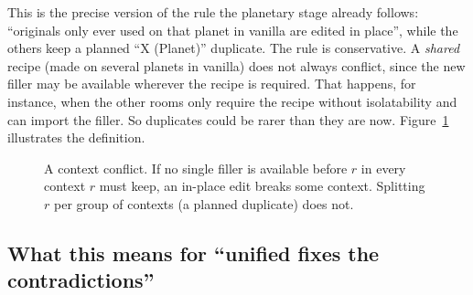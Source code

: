 This is the precise version of the rule the planetary stage already follows: ``originals only ever used on that planet in vanilla are edited in place'', while the others keep a planned ``X (Planet)'' duplicate. The rule is conservative. A \emph{shared} recipe (made on several planets in vanilla) does not always conflict, since the new filler may be available wherever the recipe is required. That happens, for instance, when the other rooms only require the recipe without isolatability and can import the filler. So duplicates could be rarer than they are now. Figure~\ref{fig:conflict} illustrates the definition. \ResultsConflict

\begin{figure}[t]
\centering
{}
\caption{A context conflict. If no single filler is available before $r$ in every context $r$ must keep, an in-place edit breaks some context. Splitting $r$ per group of contexts (a planned duplicate) does not.}
\label{fig:conflict}
\end{figure}

\subsection{What this means for ``unified fixes the contradictions''}

\ResultsMeaning
